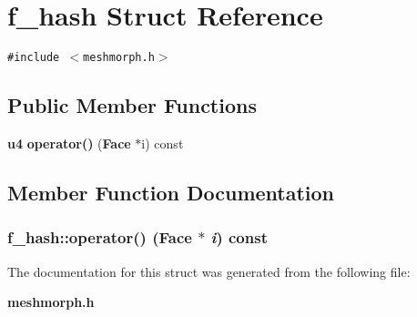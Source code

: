 \section{f\_\-hash Struct Reference}
\label{structf__hash}
{\tt \#include $<$meshmorph.h$>$}

\subsection*{Public Member Functions}
\begin{CompactItemize}
\item 
{\bf u4} {\bf operator()} ({\bf Face} $\ast$i) const
\end{CompactItemize}


\subsection{Member Function Documentation}
\subsubsection{ f\_\-hash::operator() ({\bf Face} $\ast$ {\em i}) const\hspace{0.3cm}{\tt  [inline]}}\label{structf__hash_2596dc1c7fa5d6012fcb08bd789e5b97}




The documentation for this struct was generated from the following file:\begin{CompactItemize}
\item 
{\bf meshmorph.h}\end{CompactItemize}
